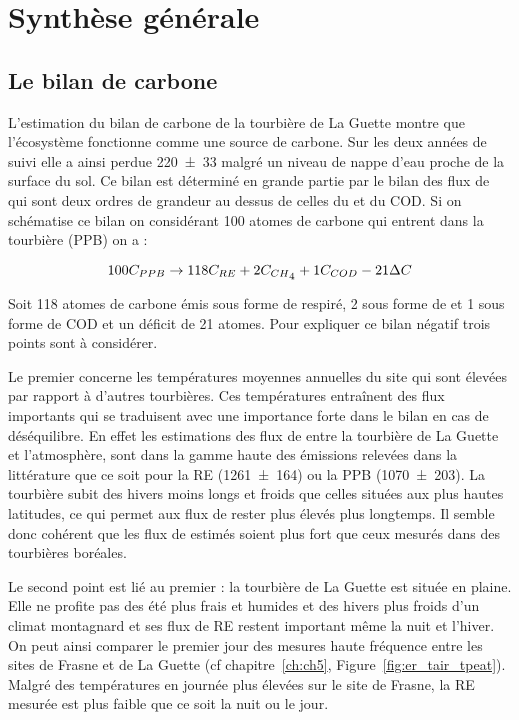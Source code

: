 \section*{Synthèse générale}


\subsection*{Le bilan de carbone}

L'estimation du bilan de carbone de la tourbière de La Guette montre que l'écosystème fonctionne comme une source de carbone.
Sur les deux années de suivi elle a ainsi perdue \SI{220(33)}{\gcma} malgré un niveau de nappe d'eau proche de la surface du sol.
Ce bilan est déterminé en grande partie par le bilan des flux de \coo qui sont deux ordres de grandeur au dessus de celles du \chh et du COD.
Si on schématise ce bilan on considérant 100 atomes de carbone qui entrent dans la tourbière (PPB) on a :

\begin{equation}
100C_{PPB} \rightarrow 118C_{RE} + 2C_{CH\textsubscript{4}} + 1C_{COD} -21\Delta C
\end{equation}

Soit 118 atomes de carbone émis sous forme de \coo respiré, 2 sous forme de \chh et 1 sous forme de COD et un déficit de 21 atomes.
Pour expliquer ce bilan négatif trois points sont à considérer.

Le premier concerne les températures moyennes annuelles du site qui sont élevées par rapport à d'autres tourbières.
Ces températures entraînent des flux importants qui se traduisent avec une importance forte dans le bilan en cas de déséquilibre.
En effet les estimations des flux de \coo entre la tourbière de La Guette et l'atmosphère, sont dans la gamme haute des émissions relevées dans la littérature que ce soit pour la RE (\SI{1261(164)}{\gcma}) ou la PPB (\SI{1070(203)}{\gcma}).
La tourbière subit des hivers moins longs et froids que celles situées aux plus hautes latitudes, ce qui permet aux flux de rester plus élevés plus longtemps.
Il semble donc cohérent que les flux de \coo estimés soient plus fort que ceux mesurés dans des tourbières boréales.

Le second point est lié au premier : la tourbière de La Guette est située en plaine. 
Elle ne profite pas des été plus frais et humides et des hivers plus froids d'un climat montagnard et ses flux de RE restent important même la nuit et l'hiver.
On peut ainsi comparer le premier jour des mesures haute fréquence entre les sites de Frasne et de La Guette (cf chapitre~\ref{ch:ch5}, Figure~\ref{fig:er_tair_tpeat}).
Malgré des températures en journée plus élevées sur le site de Frasne, la RE mesurée est plus faible que ce soit la nuit ou le jour.

